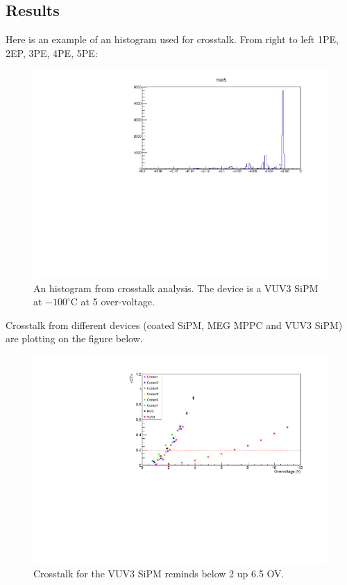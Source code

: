 \documentclass[a4paper, 11pt]{report}%
\begin{document}
  \subsection{Results}
  
  Here is an example of an histogram used for crosstalk. From right to left 1PE, 2EP, 3PE, 4PE, 5PE:
  
  \begin{figure}[!hbtp]
    \centering
    \includegraphics[totalheight=0.4\textwidth,trim=.5cm 0cm 1.8cm 0.9cm, clip=true]{../Pictures/CTHistforTalk.pdf} 
    \caption{An histogram from crosstalk analysis. The device is a VUV3 SiPM at $-100^{\circ}$C at 5 over-voltage.}
    \label{fig:histo_CT}
  \end{figure}
  
  Crosstalk from different devices (coated SiPM, MEG MPPC and VUV3 SiPM) are plotting on the figure below. 

  \begin{figure}[!hbtp]
    \centering
    \includegraphics[totalheight=0.5\textwidth,trim=.5cm 0cm 1.8cm 0.9cm, clip=true]{../Pictures/UpdatedVUV3Aug22.pdf}
    \caption{Crosstalk for the VUV3 SiPM reminds below 2 up 6.5 OV.}
    \label{fig:CT}
  \end{figure}
  
\end{document}
